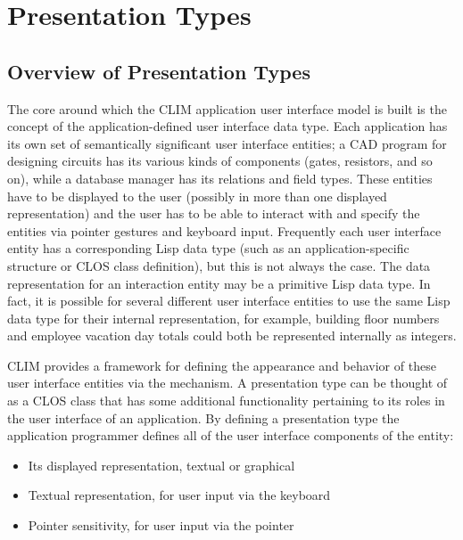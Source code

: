 
\chapter {Presentation Types}
\label {presentation-types}

\section {Overview of Presentation Types}

The core around which the CLIM application user interface model is built is the
concept of the application-defined user interface data type.  Each application
has its own set of semantically significant user interface entities; a CAD
program for designing circuits has its various kinds of components (gates,
resistors, and so on), while a database manager has its relations and field
types.  These entities have to be displayed to the user (possibly in more than
one displayed representation) and the user has to be able to interact with and
specify the entities via pointer gestures and keyboard input.  Frequently each
user interface entity has a corresponding Lisp data type (such as an
application-specific structure or CLOS class definition), but this is not always
the case.  The data representation for an interaction entity may be a primitive
Lisp data type.  In fact, it is possible for several different user interface
entities to use the same Lisp data type for their internal representation, for
example, building floor numbers and employee vacation day totals could both be
represented internally as integers.

CLIM provides a framework for defining the appearance and behavior of these user
interface entities via the  mechanism.  A
presentation type can be thought of as a CLOS class that has some additional
functionality pertaining to its roles in the user interface of an application.
By defining a presentation type the application programmer defines all of the
user interface components of the entity:

\begin{itemize}
\item Its displayed representation, textual or graphical

\item Textual representation, for user input via the keyboard

\item Pointer sensitivity, for user input via the pointer
\end{itemize}

